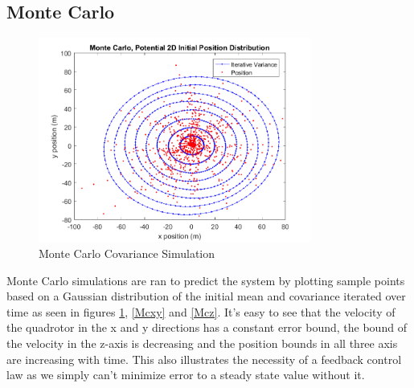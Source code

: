 \documentclass[12pt]{extarticle}
\begin{document}
{\subsection{Monte Carlo}{
\begin{figure}[h!]
    \centering
    \includegraphics[width=0.8\textwidth]{Images/MC.png}
    \caption{Monte Carlo Covariance Simulation}\label{fig:monte_carlo}
\end{figure}
Monte Carlo simulations are ran to predict the system by plotting sample points based on a Gaussian distribution of the initial mean and covariance iterated over time as seen in figures \ref{fig:monte_carlo}, \ref{Mcxy} and \ref{Mcz}. It's easy to see that the velocity of the quadrotor in the x and y directions has a constant error bound, the bound of the velocity in the z-axis is decreasing and the position bounds in all three axis are increasing with time. This also illustrates the necessity of a feedback control law as we simply can't minimize error to a steady state value without it.

}}
\end{document}
